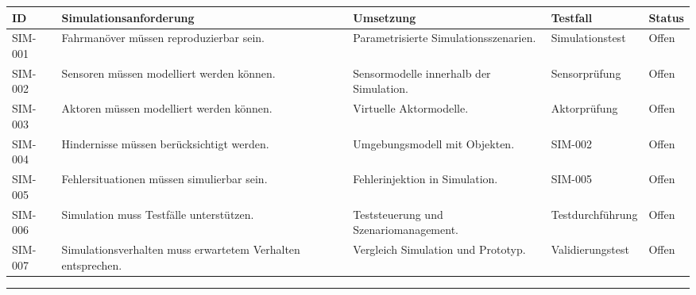 \documentclass[
]{article}
\begin{document}
\begin{longtable}[]{@{}
  >{\raggedright\arraybackslash}p{}
  >{\raggedright\arraybackslash}p{}
  >{\raggedright\arraybackslash}p{}
  >{\raggedright\arraybackslash}p{}
  >{\raggedright\arraybackslash}p{}@{}}
\toprule\noalign{}
\begin{minipage}[b]{\linewidth}\raggedright
ID
\end{minipage} & \begin{minipage}[b]{\linewidth}\raggedright
Simulationsanforderung
\end{minipage} & \begin{minipage}[b]{\linewidth}\raggedright
Umsetzung
\end{minipage} & \begin{minipage}[b]{\linewidth}\raggedright
Testfall
\end{minipage} & \begin{minipage}[b]{\linewidth}\raggedright
Status
\end{minipage} \\
\midrule\noalign{}
\endhead
\bottomrule\noalign{}
\endlastfoot
SIM-001 & Fahrmanöver müssen reproduzierbar sein. & Parametrisierte
Simulationsszenarien. & Simulationstest & Offen \\
SIM-002 & Sensoren müssen modelliert werden können. & Sensormodelle
innerhalb der Simulation. & Sensorprüfung & Offen \\
SIM-003 & Aktoren müssen modelliert werden können. & Virtuelle
Aktormodelle. & Aktorprüfung & Offen \\
SIM-004 & Hindernisse müssen berücksichtigt werden. & Umgebungsmodell
mit Objekten. & SIM-002 & Offen \\
SIM-005 & Fehlersituationen müssen simulierbar sein. & Fehlerinjektion
in Simulation. & SIM-005 & Offen \\
SIM-006 & Simulation muss Testfälle unterstützen. & Teststeuerung und
Szenariomanagement. & Testdurchführung & Offen \\
SIM-007 & Simulationsverhalten muss erwartetem Verhalten entsprechen. &
Vergleich Simulation und Prototyp. & Validierungstest & Offen \\
\end{longtable}

\begin{center}\rule{0.5\linewidth}{0.5pt}\end{center}
\end{document}
